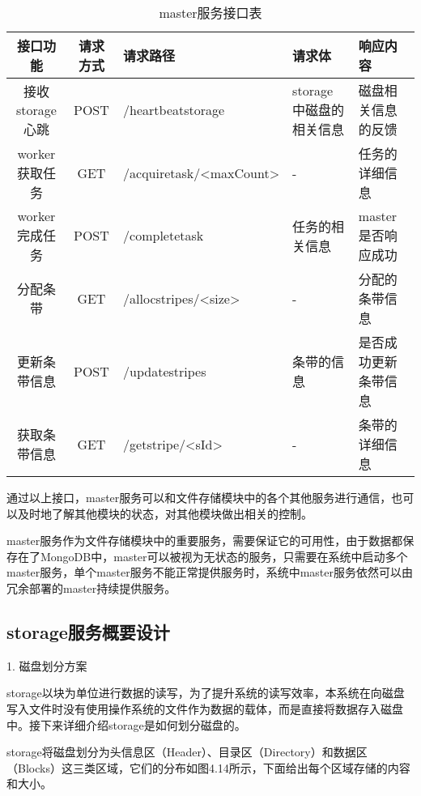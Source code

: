 \begin{table}[h]
  \centering
  \caption{master服务接口表}
  \begin{tabular}{ccp{2.5cm}p{2cm}p{3cm}}
    \toprule
    接口功能   & 请求方式    & 请求路径     & 请求体    & 响应内容                     \\
    \midrule
    接收storage心跳       & POST  & /heartbeatstorage                & storage中磁盘的相关信息   & 磁盘相关信息的反馈\\
    worker获取任务        & GET   & /acquiretask\newline/<maxCount>  & -                        & 任务的详细信息\\
    worker完成任务        & POST  & /completetask                    & 任务的相关信息            & master是否响应成功\\
    分配条带              & GET   & /allocstripes\newline/<size>     & -                        & 分配的条带信息\\
    更新条带信息          & POST  & /updatestripes                   & 条带的信息                & 是否成功更新条带信息\\
    获取条带信息          & GET   & /getstripe\newline/<sId>    & -                        & 条带的详细信息\\
    \bottomrule
  \end{tabular}
\end{table}	

通过以上接口，master服务可以和文件存储模块中的各个其他服务进行通信，也可以及时地了解其他模块的状态，对其他模块做出相关的控制。

master服务作为文件存储模块中的重要服务，需要保证它的可用性，由于数据都保存在了MongoDB中，master可以被视为无状态的服务，只需要在系统中启动多个master服务，单个master服务不能正常提供服务时，系统中master服务依然可以由冗余部署的master持续提供服务。

\subsection{storage服务概要设计}

1. 磁盘划分方案

storage以块为单位进行数据的读写，为了提升系统的读写效率，本系统在向磁盘写入文件时没有使用操作系统的文件作为数据的载体，而是直接将数据存入磁盘中。接下来详细介绍storage是如何划分磁盘的。

storage将磁盘划分为头信息区（Header）、目录区（Directory）和数据区（Blocks）这三类区域，它们的分布如图4.14所示，下面给出每个区域存储的内容和大小。

